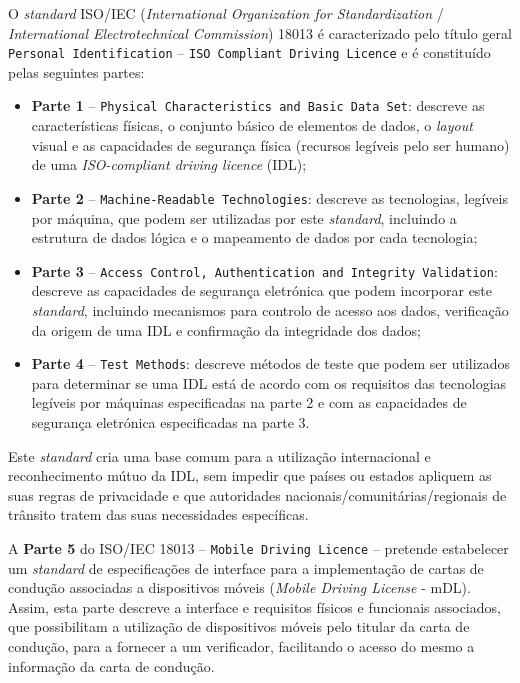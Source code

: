 
O \textit{standard} ISO/IEC (\textit{International Organization for Standardization} / \textit{International Electrotechnical Commission}) 18013 é caracterizado pelo título geral \texttt{Personal Identification} -- \texttt{ISO
Compliant Driving Licence} e é constituído pelas seguintes partes:

\begin{itemize}
	\item \textbf{Parte 1} -- \texttt{Physical Characteristics and Basic Data Set}: descreve as características físicas, o conjunto básico de elementos de dados, o \textit{layout} visual e as capacidades de segurança física (recursos legíveis pelo ser humano) de uma \textit{ISO-compliant driving licence} (IDL);
	\item \textbf{Parte 2} -- \texttt{Machine-Readable Technologies}: descreve as tecnologias, legíveis por máquina, que podem ser utilizadas por este \textit{standard}, incluindo a estrutura de dados lógica e o mapeamento de dados por cada tecnologia;
	\item \textbf{Parte 3} -- \texttt{Access Control, Authentication and Integrity Validation}: descreve as capacidades de segurança eletrónica que podem incorporar este \textit{standard}, incluindo mecanismos para controlo de acesso aos dados, verificação da origem de uma IDL e confirmação da integridade dos dados;
	\item \textbf{Parte 4} -- \texttt{Test Methods}: descreve métodos de teste que podem ser utilizados para determinar se uma IDL está de acordo com os requisitos das tecnologias legíveis por máquinas especificadas na parte 2 e com as capacidades de segurança eletrónica especificadas na parte 3.
\end{itemize}

Este \textit{standard} cria uma base comum para a utilização internacional e reconhecimento mútuo da IDL, sem impedir que países ou estados apliquem as suas regras de privacidade e que autoridades nacionais/comunitárias/regionais de trânsito tratem das suas necessidades específicas.

A \textbf{Parte 5} do ISO/IEC 18013 -- \texttt{Mobile Driving Licence} -- pretende estabelecer um \textit{standard} de especificações de interface para a implementação de cartas de condução associadas a dispositivos móveis (\textit{Mobile Driving License} - mDL). Assim, esta parte descreve a interface e requisitos físicos e funcionais associados, que possibilitam a utilização de dispositivos móveis pelo titular da carta de condução, para a fornecer a um verificador, facilitando o acesso do mesmo a informação da carta de condução.

